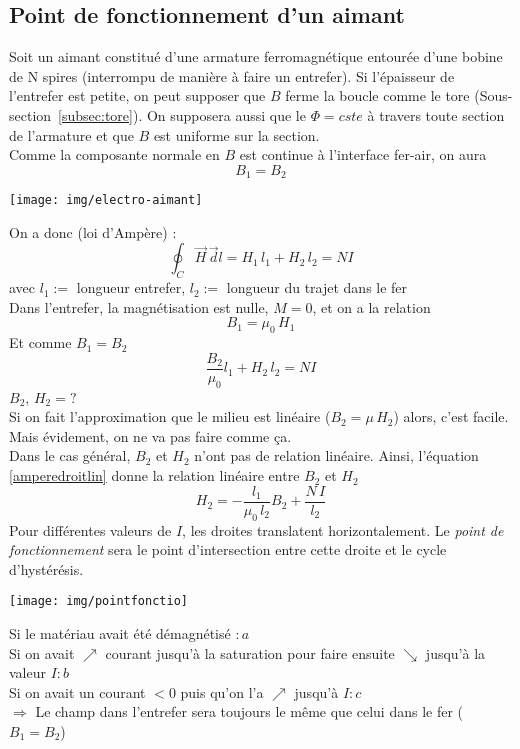 \documentclass[11pt, a4paper, openany]{book}
\begin{document}
		\subsection{Point de fonctionnement d'un aimant}
		Soit un aimant constitué d'une armature ferromagnétique entourée d'une bobine de N spires (interrompu de manière à faire un entrefer). Si l'épaisseur de l'entrefer est petite, on peut supposer que $B$ ferme la boucle comme le tore (Sous-section~\ref{subsec:tore}). On supposera aussi que le $\Phi=cste$ à travers toute section de l'armature et que $B$ est uniforme sur la section.\\
		
		Comme la composante normale en $B$ est continue à l'interface fer-air, on aura 
		\begin{equation}
		B_1=B_2
		\end{equation}
		\begin{center}
			\texttt{[image: img/electro-aimant]}
		\end{center}
		On a donc (loi d'Ampère) : \begin{equation}
		\oint_C\vec H\,\vec dl=H_1\,l_1+H_2\,l_2=NI
		\end{equation}
		avec $l_1:=$ longueur entrefer, $l_2:=$ longueur du trajet dans le fer\\
		Dans l'entrefer, la magnétisation est nulle, $M=0$, et on a la relation \begin{equation}
		B_1=\mu_0\,H_1
		\end{equation}\label{amperedroitlin}
		Et comme $B_1=B_2$\begin{equation}
		\frac{B_2}{\mu_0}l_1+H_2\,l_2=NI
		\end{equation}
		$B_2$, $H_2=?$\\
		Si on fait l'approximation que le milieu est linéaire ($B_2=\mu\,H_2$) alors, c'est facile. Mais évidement, on ne va pas faire comme ça.\\
		Dans le cas général, $B_2$ et $H_2$ n'ont pas de relation linéaire. Ainsi, l'équation \eqref{amperedroitlin} donne la relation linéaire entre $B_2$ et $H_2$ \begin{equation}
		H_2=-\frac{l_1}{\mu_0\,l_2}B_2+\frac{N\,I}{l_2}
		\end{equation}
		Pour différentes valeurs de $I$, les droites translatent horizontalement. Le \textit{point de fonctionnement} sera le point d'intersection entre cette droite et le cycle d'hystérésis.
		\begin{center}
			\texttt{[image: img/pointfonctio]}
		\end{center}
		Si le matériau avait été démagnétisé $:a$\\ Si on avait $\nearrow$ courant jusqu'à la saturation pour faire ensuite $\searrow$ jusqu'à la valeur $I:b$ \\Si on avait un courant $<0$ puis qu'on l'a $\nearrow$ jusqu'à $I: c$\\ 
		$\Rightarrow$ Le champ dans l'entrefer sera toujours le même que celui dans le fer ($B_1=B_2$)\\
		
\end{document}
